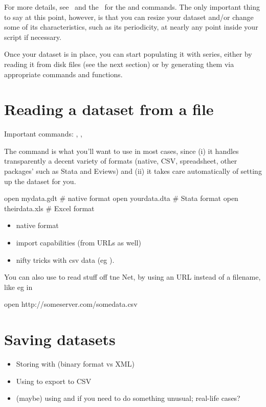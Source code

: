 For more details, see \GUG\ and the \GCR\ for the  and
 commands. The only important thing to say at this point,
however, is that you can resize your dataset and/or change some of its
characteristics, such as its periodicity, at nearly any point inside
your script if necessary.

Once your dataset is in place, you can start populating it with
series, either by reading it from disk files (see the next section) or
by generating them via appropriate commands and functions.

\section{Reading a dataset from a file}

Important commands: , , 

The  command is what you'll want to use in most cases, since
(i) it handles transparently a decent variety of formats (native, CSV,
spreadsheet, other packages' such as Stata and Eviews) and (ii) it
takes care automatically of setting up the dataset for you.
\begin{code}
  open mydata.gdt    # native format
  open yourdata.dta  # Stata format
  open theirdata.xls # Excel format
\end{code}

\begin{itemize}
\item native format
\item import capabilities (from URLs as well)
\item nifty tricks with csv data (eg ).
\end{itemize}

You can also use  to read stuff off tne Net, by using an URL
instead of a filename, like eg in
\begin{code}
  open http://someserver.com/somedata.csv
\end{code}

\section{Saving datasets}

\begin{itemize}
\item Storing with  (binary format vs XML)
\item Using  to export to CSV
\item (maybe) using  and  if you need to do
  something unusual; real-life cases?
\end{itemize}

